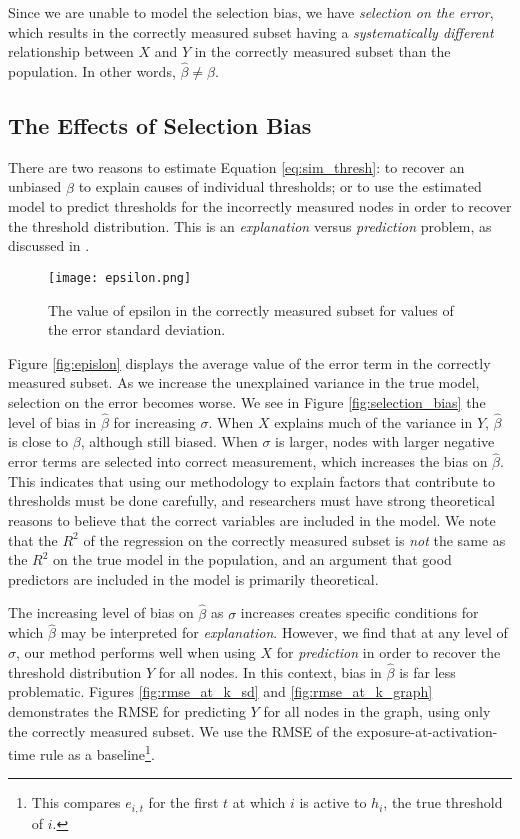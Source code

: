 \documentclass[a4paper]{article}
\begin{document}
Since we are unable to model the selection bias, we have \emph{selection on the error}, which results in the correctly measured subset having a \emph{systematically different} relationship between $X$ and $Y$ in the correctly measured subset than the population. In other words, $\hat{\beta} \neq \beta$.

\subsection{The Effects of Selection Bias}

There are two reasons to estimate Equation \ref{eq:sim_thresh}: to recover an unbiased $\hat{\beta}$ to explain causes of individual thresholds; or to use the estimated model to predict thresholds for the incorrectly measured nodes in order to recover the threshold distribution. This is an \emph{explanation} versus \emph{prediction} problem, as discussed in \cite{Kleinberg2015}.

\begin{figure}[h]
\label{fig:epsilon}
\texttt{[image: epsilon.png]}
\caption{The value of epsilon in the correctly measured subset for values of the error standard deviation.}
\end{figure}

Figure \ref{fig:epislon} displays the average value of the error term in the correctly measured subset. As we increase the unexplained variance in the true model, selection on the error becomes worse. We see in Figure \ref{fig:selection_bias} the level of bias in $\hat{\beta}$ for increasing $\sigma$. When $X$ explains much of the variance in $Y$, $\hat{\beta}$ is close to $\beta$, although still biased. When $\sigma$ is larger, nodes with larger negative error terms are selected into correct measurement, which increases the bias on $\hat{\beta}$. This indicates that using our methodology to explain factors that contribute to thresholds must be done carefully, and researchers must have strong theoretical reasons to believe that the correct variables are included in the model. We note that the $R^2$ of the regression on the correctly measured subset is \emph{not} the same as the $R^2$ on the true model in the population, and an argument that good predictors are included in the model is primarily theoretical.

The increasing level of bias on $\hat{\beta}$ as $\sigma$ increases creates specific conditions for which $\hat{\beta}$ may be interpreted for \emph{explanation}. However, we find that at any level of $\sigma$, our method performs well when using $X$ for \emph{prediction} in order to recover the threshold distribution $Y$ for all nodes. In this context, bias in $\hat{\beta}$ is far less problematic. Figures \ref{fig:rmse_at_k_sd} and \ref{fig:rmse_at_k_graph} demonstrates the RMSE for predicting $Y$ for all nodes in the graph, using only the correctly measured subset. We use the RMSE of the exposure-at-activation-time rule as a baseline\footnote{This compares $e_{i,t}$ for the first $t$ at which $i$ is active to $h_i$, the true threshold of $i$.}.
\end{document}
